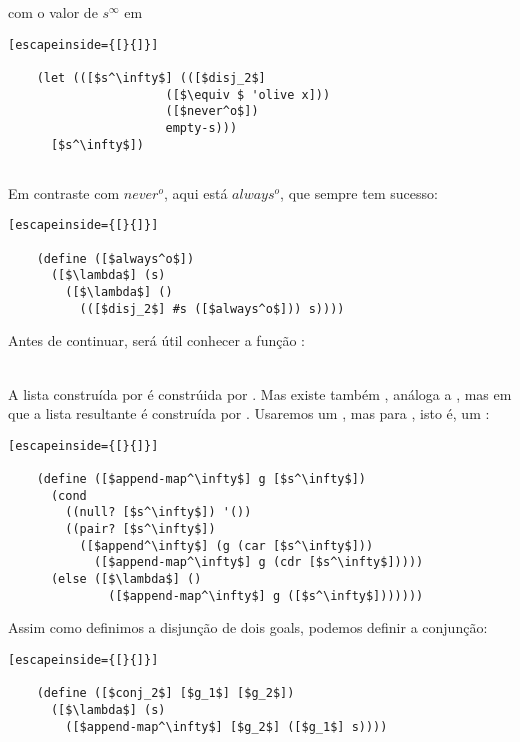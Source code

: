 \documentclass{article}
\begin{document}
  \noindent com o valor de $s^\infty$ em

  \begin{lstlisting}[escapeinside={[}{]}]

    (let (([$s^\infty$] (([$disj_2$]
                      ([$\equiv $ 'olive x]))
                      ([$never^o$])
                      empty-s)))
      [$s^\infty$])
                      
  \end{lstlisting}

  Em contraste com $never^o$, aqui está $always^o$, que sempre tem sucesso:

  \begin{lstlisting}[escapeinside={[}{]}]

    (define ([$always^o$])
      ([$\lambda$] (s)
        ([$\lambda$] ()
          (([$disj_2$] #s ([$always^o$])) s))))

  \end{lstlisting}

  Antes de continuar, será útil conhecer a função :\\
   \seta\ 

  \noindent A lista construída por  é constrúida por
  . Mas existe também , análoga
  a , mas em que a lista resultante é construída por
  . Usaremos um , mas para
  , isto é, um :

  \begin{lstlisting}[escapeinside={[}{]}]

    (define ([$append-map^\infty$] g [$s^\infty$])
      (cond
        ((null? [$s^\infty$]) '())
        ((pair? [$s^\infty$])
          ([$append^\infty$] (g (car [$s^\infty$]))
            ([$append-map^\infty$] g (cdr [$s^\infty$]))))
      (else ([$\lambda$] ()
              ([$append-map^\infty$] g ([$s^\infty$]))))))

  \end{lstlisting}

  Assim como definimos a disjunção de dois goals, podemos
  definir a conjunção:

  \begin{lstlisting}[escapeinside={[}{]}]

    (define ([$conj_2$] [$g_1$] [$g_2$])
      ([$\lambda$] (s)
        ([$append-map^\infty$] [$g_2$] ([$g_1$] s))))

  \end{lstlisting}
\end{document}
